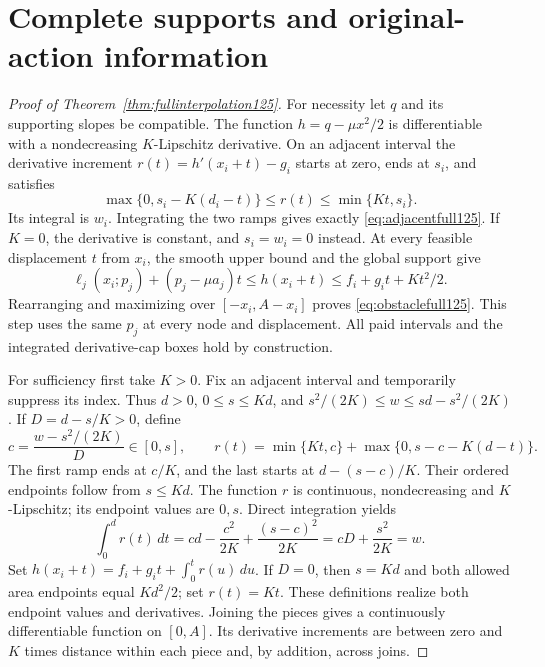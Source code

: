 \section{Complete supports and original-action information}
\label{supp:fullsupport125}

\begin{proof}[Proof of Theorem~\ref{thm:fullinterpolation125}]
For necessity let $q$ and its supporting slopes be compatible. The
function $h=q-\mu x^2/2$ is differentiable with a nondecreasing
$K$-Lipschitz derivative. On an adjacent interval the derivative
increment $r(t)=h'(x_i+t)-g_i$ starts at zero, ends at $s_i$, and
satisfies
\[
 \max\{0,s_i-K(d_i-t)\}\le r(t)\le\min\{Kt,s_i\}.
\]
Its integral is $w_i$. Integrating the two ramps gives exactly
\eqref{eq:adjacentfull125}. If $K=0$, the derivative is constant,
and $s_i=w_i=0$ instead. At every feasible displacement $t$ from
$x_i$, the smooth upper bound and the global support give
\[
 \ell_j(x_i;p_j)+(p_j-\mu a_j)t
 \le h(x_i+t)\le f_i+g_it+Kt^2/2.
\]
Rearranging and maximizing over $[-x_i,A-x_i]$ proves
\eqref{eq:obstaclefull125}. This step uses the same $p_j$ at
every node and displacement. All paid intervals and the integrated
derivative-cap boxes hold by construction.

For sufficiency first take $K>0$. Fix an adjacent interval and
temporarily suppress its index. Thus $d>0$, $0\le s\le Kd$, and
$s^2/(2K)\le w\le sd-s^2/(2K)$. If $D=d-s/K>0$, define
\[
 c=\frac{w-s^2/(2K)}{D}\in[0,s],\qquad
 r(t)=\min\{Kt,c\}+\max\{0,s-c-K(d-t)\}.
\]
The first ramp ends at $c/K$, and the last starts at
$d-(s-c)/K$. Their ordered endpoints follow from $s\le Kd$.
The function $r$ is continuous, nondecreasing and $K$-Lipschitz;
its endpoint values are $0,s$. Direct integration yields
\[
 \int_0^d r(t)\,dt
   =cd-\frac{c^2}{2K}+\frac{(s-c)^2}{2K}
   =cD+\frac{s^2}{2K}=w.
\]
Set
$h(x_i+t)=f_i+g_it+\int_0^t r(u)\,du$.
If $D=0$, then $s=Kd$ and both allowed area endpoints equal
$Kd^2/2$; set $r(t)=Kt$. These definitions realize both endpoint
values and derivatives. Joining the pieces gives a continuously
differentiable function on $[0,A]$. Its derivative increments are
between zero and $K$ times distance within each piece and, by
addition, across joins.


\end{proof}
